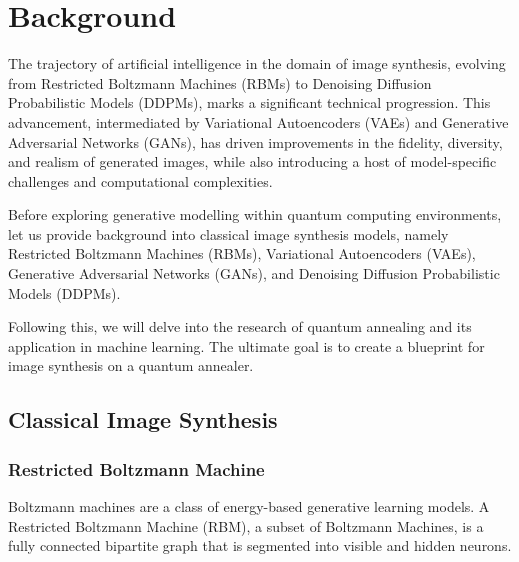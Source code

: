 \documentclass[%
 reprint,
 amsmath,amssymb,
 aps,
]{revtex4-2}
\begin{document}
\section{Background}
The trajectory of artificial intelligence in the domain of image synthesis, evolving from Restricted Boltzmann Machines (RBMs) to Denoising Diffusion Probabilistic Models (DDPMs), marks a significant technical progression. This advancement, intermediated by Variational Autoencoders (VAEs) and Generative Adversarial Networks (GANs), has driven improvements in the fidelity, diversity, and realism of generated images, while also introducing a host of model-specific challenges and computational complexities.


Before exploring generative modelling within quantum computing environments, let us provide background into classical image synthesis models, namely Restricted Boltzmann Machines (RBMs), Variational Autoencoders (VAEs), Generative Adversarial Networks (GANs), and Denoising Diffusion Probabilistic Models (DDPMs).


Following this, we will delve into the research of quantum annealing and its application in machine learning. The ultimate goal is to create a blueprint for image synthesis on a quantum annealer.

\subsection{Classical Image Synthesis}
\subsubsection{Restricted Boltzmann Machine}
Boltzmann machines are a class of energy-based generative learning models. A Restricted Boltzmann Machine (RBM), a subset of Boltzmann Machines, is a fully connected bipartite graph that is segmented into visible and hidden neurons.
\end{document}
